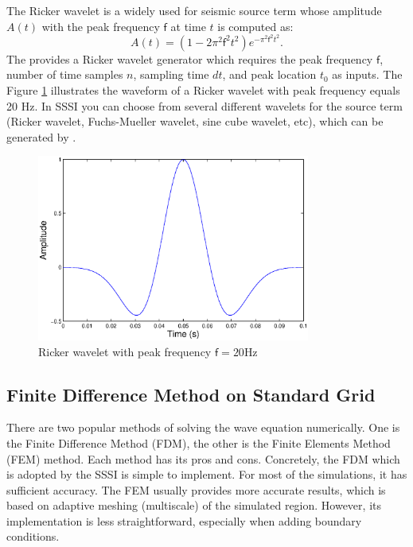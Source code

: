 \documentclass[11pt]{article}
\newcommand{\sff}{\mathsf{f}}
\theoremstyle{plain}
\theoremstyle{definition}
\theoremstyle{remark}
\numberwithin{equation}{section}
\begin{document}
The Ricker wavelet is a widely used for seismic source term whose amplitude $A(t)$ with the peak frequency $\sff$ at time $t$ is computed 
as:
\begin{equation}
A(t)=(1-2\pi^2 \sff^2 t^2)e^{-\pi^2 \sff^2 t^2}.
\end{equation}
The  provides a Ricker wavelet generator which requires the peak frequency $\sff$, number of time samples $n$, 
sampling time $dt$, and peak location $t_0$ as inputs. The Figure \ref{fig:ricker} illustrates the waveform of a Ricker wavelet with peak frequency equals 20 Hz. In SSSI you can choose from several different wavelets for the source term (Ricker wavelet, Fuchs-Mueller wavelet, sine cube wavelet, etc), which can be generated by .

\begin{figure}
\centering
\includegraphics[width=0.8\textwidth]{Fig/ricker}
\caption{Ricker wavelet with peak frequency $\sff=20$Hz}
\label{fig:ricker}
\end{figure}

\subsection{Finite Difference Method on Standard Grid}
There are two popular methods of solving the wave equation numerically. One is the Finite Difference Method (FDM), the other is the Finite Elements Method (FEM) method. Each method has its pros and cons. Concretely, the FDM which is adopted by the SSSI is simple to implement. For most of the simulations, it has sufficient accuracy. The FEM usually provides more accurate results, which is based on adaptive meshing (multiscale) of the simulated region. However, its implementation is less straightforward, especially when adding boundary conditions.   
\end{document}
